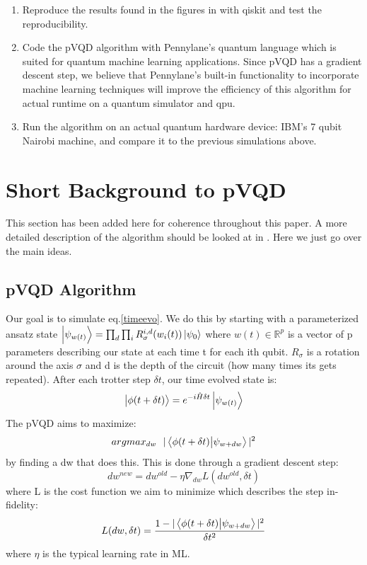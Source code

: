 \documentclass{article}
\begin{document}
\begin{enumerate}
    \item Reproduce the results found in the figures in \cite{Barison_2021} with qiskit and test the reproducibility.
    \item Code the pVQD algorithm with Pennylane's quantum language which is suited for quantum machine learning applications. Since pVQD has a gradient descent step, we believe that Pennylane's built-in functionality to incorporate machine learning techniques will improve the efficiency of this algorithm for actual runtime on a quantum simulator and qpu.
    \item Run the algorithm on an actual quantum hardware device: IBM's 7 qubit Nairobi machine, and compare it to the previous simulations above.
\end{enumerate}

\section{Short Background to pVQD}
This section has been added here for coherence throughout this paper. A more detailed description of the algorithm should be looked at in \cite{Barison_2021}. Here we just go over the main ideas.
\subsection{pVQD Algorithm}
Our goal is to simulate eq.\ref{timeevo}. We do this by starting with a parameterized ansatz state $\ket{\psi_{w(t)}} = \prod_d \prod_i R^{i,d}_\sigma (w_i(t))\ket{\psi_0}$ where $w(t) \in \mathbb{R}^p$ is a vector of p parameters describing our state at each time t for each ith qubit. $R_\sigma$ is a rotation around the axis $\sigma$ and d is the depth of the circuit (how many times its gets repeated). After each trotter step $\delta t$, our time evolved state is:
\begin{equation}
    \ket{\phi(t+\delta t)} = e^{-i\hat{H}\delta t}\ket{\psi_{w(t)}}
\end{equation}
The pVQD aims to maximize:
\begin{equation}
    argmax_{dw} \ \ |\bra{\phi(t+\delta t)}\ket{\psi_{w+dw}} |^2
\end{equation}
by finding a dw that does this. This is done through a gradient descent step:
\begin{equation}
    dw^{new} = dw^{old} - \eta \nabla_{dw} L(dw^{old}, \delta t)
\end{equation}
where L is the cost function we aim to minimize which describes the step in-fidelity:
\begin{equation}
    L(dw, \delta t) = \frac{1-|\bra{\phi(t+\delta t)}\ket{\psi_{w+dw}} |^2}{\delta t^2}
\end{equation}
where $\eta$ is the typical learning rate in ML.
\end{document}
